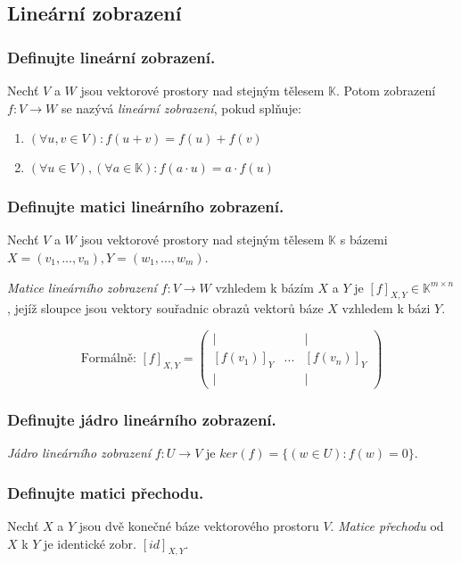 \documentclass[10pt,a4paper]{article}
\begin{document}
\subsection{Lineární zobrazení}
\subsubsection{Definujte lineární zobrazení.}
Nechť $V$ a $W$ jsou vektorové prostory nad stejným tělesem $\mathbb{K}$. Potom zobrazení $f: V \to W$ se nazývá \textit{lineární zobrazení}, pokud splňuje:
\begin{enumerate}
\item $(\forall u,v \in V): f(u+v) = f(u) + f(v)$
\item $(\forall u \in V), (\forall a \in \mathbb{K}): f(a\cdot u) = a\cdot f(u)$
\end{enumerate}

\subsubsection{Definujte matici lineárního zobrazení.}

Nechť $V$ a $W$ jsou vektorové prostory nad stejným tělesem $\mathbb{K}$ s bázemi $X = (v_1, ..., v_n), Y=(w_1, ..., w_m)$.

\textit{Matice lineárního zobrazení} $f:V\to W$ vzhledem k bázím $X$ a $Y$ je $[f]_{X,Y}\in \mathbb{K}^{m\times n}$, jejíž sloupce jsou vektory souřadnic obrazů vektorů báze $X$ vzhledem k bázi $Y$.

\[
    \text{Formálně: }[f]_{X,Y} = 
  \begin{pmatrix}
    \mid & & \mid \\
    [f(v_1)]_Y & ... & [f(v_n)]_Y\\
    \mid & & \mid
  \end{pmatrix}
\]

\subsubsection{Definujte jádro lineárního zobrazení.}

\textit{Jádro lineárního zobrazení} $f:U\to V$ je $ker(f) = \{(w \in U) : f(w) = 0\}$.


\subsubsection{Definujte matici přechodu.}

Nechť $X$ a $Y$ jsou dvě konečné báze vektorového prostoru $V$. \textit{Matice přechodu} od $X$ k $Y$ je identické zobr. $[id]_{X,Y}$.
\end{document}
